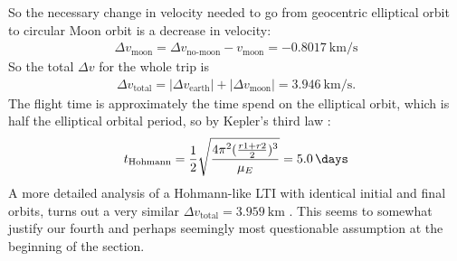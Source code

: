 So the necessary change in velocity needed to go from geocentric elliptical orbit to circular Moon orbit is a decrease in velocity:
\begin{align}
\Delta v_{\text{moon}} = \Delta v_{\text{no-moon}} - v_{\text{moon}} = \SI{-0.8017}{\km\per\s} \label{eq:deltav-moon}
\end{align}
So the total $\Delta v$ for the whole trip is
\begin{align}
\Delta v_{\text{total}} = |\Delta v_{\text{earth}}| + |\Delta v_{\text{moon}}| = \SI{3.946}{\km\per\s} \label{eq:hohmann-delta-v} .
\end{align}
The flight time is approximately the time spend on the elliptical orbit, which is half the elliptical orbital period, so by Kepler's third law \cite{Murray1999}:
\begin{align}
t_{\text{Hohmann}} = \dfrac{1}{2}\sqrt{\dfrac{4\pi^2 (\frac{r1+r2}{2})^3}{\mu_E}} = \SI{5.0}{\days} \label{eq:hohmann-flight-time}
\end{align}
A more detailed analysis of a Hohmann-like LTI with identical initial and final orbits, turns out a very similar $\Delta v_{\text{total}} = \SI{3.959}{\km}$ \cite{Sweetser1991} \cite{Juul2008}. This seems to somewhat justify our fourth and perhaps seemingly most questionable assumption at the beginning of the section.

